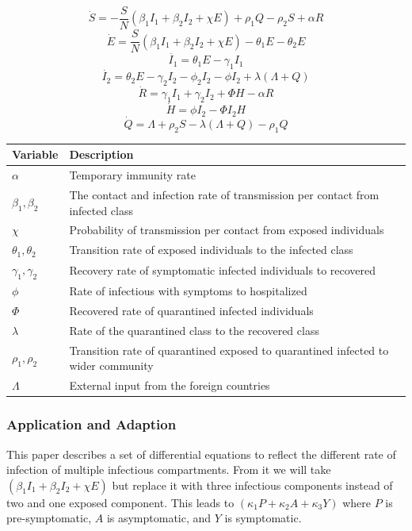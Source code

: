 \documentclass{article}
\begin{document}
\[\dot{S} = - \frac{S}{N} (\beta _1 I_1 + \beta _2 I_2 + \chi E) + \rho _1 Q - \rho _2 S + \alpha R\]
\[\dot{E} = \frac{S}{N} (\beta _1 I_1 + \beta _2 I_2 + \chi E) - \theta _1 E - \theta _2 E \]
\[\dot{I_1} = \theta _1 E - \gamma _1 I_1 \]
\[\dot{I_2} = \theta _2 E - \gamma _2 I_2 - \phi _2 I_2 - \phi I_2 + \lambda (\Lambda + Q) \]
\[\dot{R} = \gamma _1 I_1 + \gamma _2 I_2 + \Phi H - \alpha R \]
\[\dot{H} = \phi I_2 - \Phi I_2 H \]
\[\dot{Q} = \Lambda + \rho _2 S - \lambda (\Lambda + Q) - \rho _1 Q \]
\begin{tabular}{|l | l |} 
 \hline
 Variable & Description \\ [0.5ex] 
 \hline\hline
 $\alpha$ & Temporary immunity rate \\
 \hline
 $\beta _1 , \beta _2 $ & The contact and infection rate of transmission per contact from infected class \\
 \hline
 $\chi$ & Probability of transmission per contact from exposed individuals \\
 \hline
 $\theta _1 , \theta _2 $ & Transition rate of exposed individuals to the infected class \\
 \hline
 $\gamma _1 , \gamma _2 $ & Recovery rate of symptomatic infected individuals to recovered \\
 \hline
  $\phi$ & Rate of infectious with symptoms to hospitalized \\
  \hline
  $\Phi$ & Recovered rate of quarantined infected individuals \\
  \hline
  $\lambda$ & Rate of the quarantined class to the recovered class \\
  \hline
  $\rho _1 , \rho _2$ & Transition rate of quarantined exposed to quarantined infected to wider community \\
  \hline
  $\Lambda$ & External input from the foreign countries \\
  \hline
\end{tabular}
\cite{dynamic}
\subsubsection{Application and Adaption}
This paper describes a set of differential equations to reflect the different rate of infection of multiple infectious compartments. From it we will take $(\beta _1 I_1 + \beta _2 I_2 + \chi E)$ but replace it with three infectious components instead of two and one exposed component. This leads to $(\kappa_1 P + \kappa _2 A + \kappa_3 Y)$ where $P$ is pre-symptomatic, $A$ is asymptomatic, and $Y$ is symptomatic.
\end{document}

